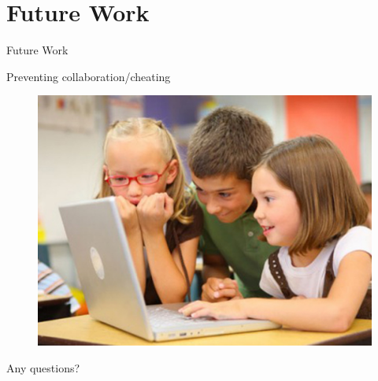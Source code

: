 \documentclass{beamer}
\begin{document}
\section{Future Work}

\begin{frame}{Future Work}
\centerline{Preventing collaboration/cheating}
\begin{figure}
\includegraphics[width=0.85\linewidth]{assets/group}
\end{figure}
\end{frame}

\begin{frame}[standout]
\Large{\alert{Any questions?}}

\end{frame}

\end{document}
